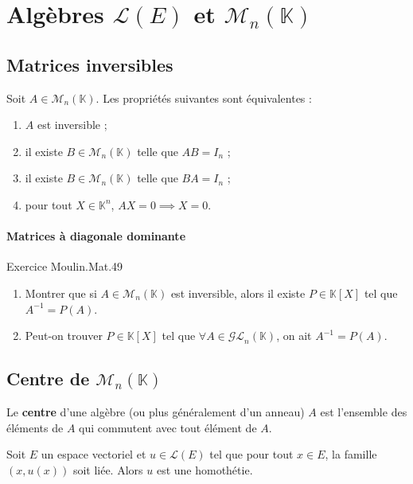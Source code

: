 \documentclass[french]{article}
\newcommand{\K}{\mathbb{K}}
\newcommand{\inv}{^{-1}}
\theoremstyle{plain}
\theoremstyle{definition}
\theoremstyle{remark}
\begin{document}
\section{Algèbres $\mathcal{L}(E)$ et $\mathcal{M}_n(\K)$}

\subsection{Matrices inversibles}

\begin{prop}
	Soit $A\in\mathcal{M}_n(\K)$. Les propriétés suivantes sont équivalentes :
	\begin{enumerate}[label=(\roman*)]
		\item $A$ est inversible ;
		\item il existe $B\in\mathcal{M}_n(\K)$ telle que $AB=I_n$ ;
		\item il existe $B\in\mathcal{M}_n(\K)$ telle que $BA=I_n$ ;
		\item pour tout $X\in\K^n$, $AX=0\implies X=0$.
	\end{enumerate}
\end{prop}

\paragraph{Matrices à diagonale dominante} Exercice Moulin.Mat.49

\begin{exo}
	\begin{enumerate}
		\item Montrer que si $A\in\mathcal{M}_n(\K)$ est inversible, alors il existe $P\in\K[X]$ tel que $A\inv=P(A)$.
		\item Peut-on trouver $P\in\K[X]$ tel que $\forall A\in\mathcal{GL}_n(\K)$, on ait $A\inv=P(A)$.
	\end{enumerate}
\end{exo}

\subsection{Centre de $\mathcal{M}_n(\K)$}

\begin{dfn}
	Le \textbf{centre} d'une algèbre (ou plus généralement d'un anneau) $A$ est l'ensemble des éléments de $A$ qui commutent avec tout élément de $A$.
\end{dfn}

\begin{prop}%
	Soit $E$ un espace vectoriel et $u\in\mathcal{L}(E)$ tel que pour tout $x\in E$, la famille $(x,u(x))$ soit liée. Alors $u$ est une homothétie.
\end{prop}
\end{document}
